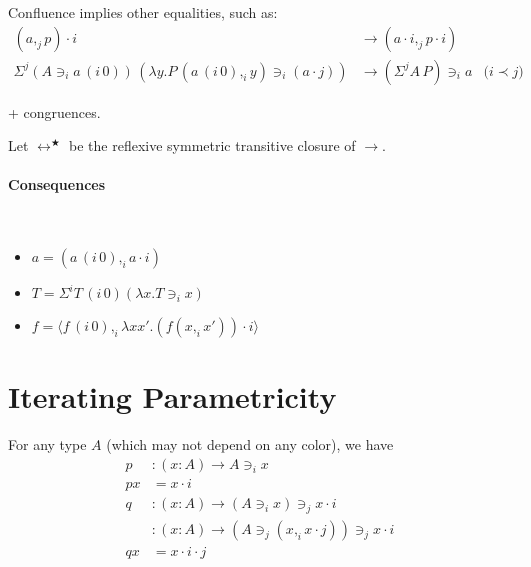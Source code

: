 \documentclass[english]{PaperTools/latex/lipics}
\newcommand\CP[3]{(#2,_{#1} #3)}
\newcommand\CSig[1]{\Sigma^{#1}}
\newcommand\param[1]{\!\cdot\!#1}
\newcommand\op[1]{∋_{#1}}
\newcommand\ip[3]{Σ^{#1} {#2}\,{#3}}
\newcommand\fp[3]{⟨#2 ,_{#1} #3⟩}
\newcommand\mor[2]{{#1}\,{#2}}
\newcommand\proj[2]{\mor{#2}{(#1\,0)}}
\begin{document}
Confluence implies other equalities, such as:
\begin{align*}
  {(a,_j p)} \param i &→ (a \param i ,_j p \param i)\\
  \ip j {(A \op i {\proj i a})} {(λy. P \, \CP i {\proj i a} y \op i {(a \param j)})} &→ {(\ip j A P)} \op i a &\text{($i \prec j$)}
\end{align*}

+ congruences.

\begin{definition}[Conversion]
  Let $↔^★$ be the reflexive symmetric transitive closure of $→$.
\end{definition}

\paragraph{Consequences}
\begin{corollary}~
  \begin{itemize}
  \item $a = \CP i {\proj i a} {a \param i}$
  \item $T = \CSig i {\proj i T} {(λx. T \op i x)}$
  \item $f = \fp i {\proj i f} {λx x'. (f \CP i x {x'}) \param i}$
  \end{itemize}
\end{corollary}

\section{Iterating Parametricity}
For any type $A$ (which may not depend on any color), we have
\begin{align*}
p &: (x:A) → A \op i x\\
p x &= x\param i\\
q &: (x:A) → (A \op i x) \op j x \param  i\\
  &: (x:A) → (A \op j \CP i x {x \param j}) \op j x \param  i\\
q x &= x\param i\param j
\end{align*}
\end{document}
